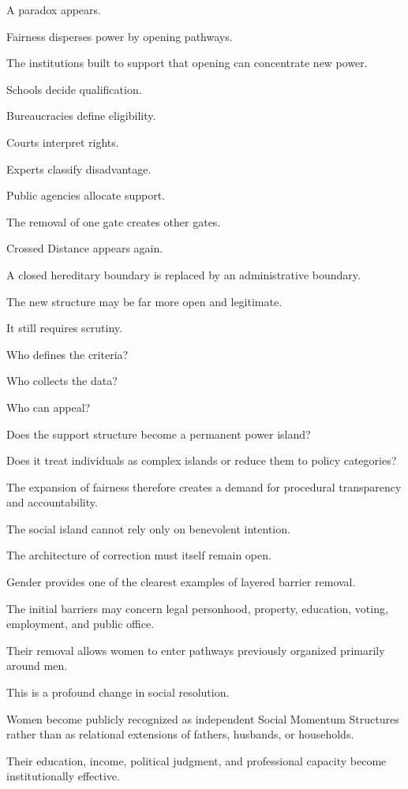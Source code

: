 A paradox appears.

Fairness disperses power by opening pathways.

The institutions built to support that opening can concentrate new power.

Schools decide qualification.

Bureaucracies define eligibility.

Courts interpret rights.

Experts classify disadvantage.

Public agencies allocate support.

The removal of one gate creates other gates.

Crossed Distance appears again.

A closed hereditary boundary is replaced by an administrative boundary.

The new structure may be far more open and legitimate.

It still requires scrutiny.

Who defines the criteria?

Who collects the data?

Who can appeal?

Does the support structure become a permanent power island?

Does it treat individuals as complex islands or reduce them to policy categories?

The expansion of fairness therefore creates a demand for procedural transparency and accountability.

The social island cannot rely only on benevolent intention.

The architecture of correction must itself remain open.

Gender provides one of the clearest examples of layered barrier removal.

The initial barriers may concern legal personhood, property, education, voting, employment, and public office.

Their removal allows women to enter pathways previously organized primarily around men.

This is a profound change in social resolution.

Women become publicly recognized as independent Social Momentum Structures rather than as relational extensions of fathers, husbands, or households.

Their education, income, political judgment, and professional capacity become institutionally effective.

